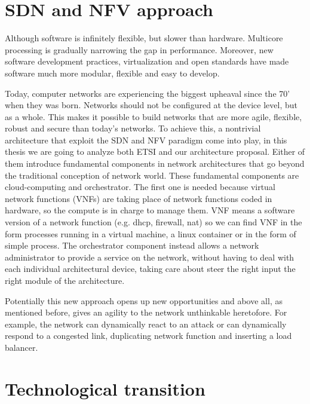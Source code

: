 \section{SDN and NFV approach}

Although software is infinitely flexible, but slower than hardware. Multicore processing is gradually narrowing the gap in performance. Moreover, new software development practices, virtualization and open standards have made software much more modular, flexible and easy to develop. 


Today, computer networks are experiencing the biggest upheaval since the 70' when they was born. Networks should not be configured at the device level, but as a whole. This makes it possible to build networks that are more agile, flexible, robust and secure than today's networks.
To achieve this, a nontrivial architecture that exploit the SDN and NFV paradigm come into play, in this thesis we are going to analyze both ETSI and our architecture proposal.
Either of them introduce fundamental components in network architectures that go beyond the traditional conception of network world. These fundamental components are cloud-computing and orchestrator.
The first one is needed because virtual network functions (VNFs) are taking place of network functions coded in hardware, so the compute is in charge to manage them. VNF means a software version of a network function (e.g. dhcp, firewall, nat) so we can find VNF in the form processes running in a virtual machine, a linux container or in the form of simple process. The orchestrator component instead allows a network administrator to provide a service on the network, without having to deal with each individual architectural device, taking care about steer the right input the right module of the architecture.
 
Potentially this new approach opens up new opportunities and above all, as mentioned before, gives an agility to the network unthinkable heretofore. For example, the network can dynamically react to an attack or can dynamically respond to a congested link, duplicating network function and inserting a load balancer.

\section{Technological transition}

